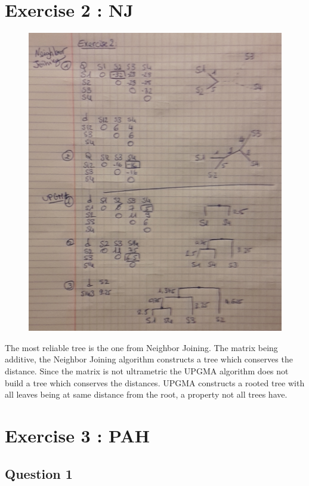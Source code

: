 \documentclass[]{article}
\begin{document}
\section{Exercise 2 : NJ}
\begin{figure}[h]
	\includegraphics*[width = \linewidth, height =0.7\textheight]{ex2.jpg}
\end{figure}
The most reliable tree is the one from Neighbor Joining. The matrix being additive, the Neighbor Joining algorithm constructs a tree which conserves the distance. Since the matrix is not ultrametric the UPGMA algorithm does not build a tree which conserves the distances. UPGMA constructs a rooted tree with all leaves being at same distance from the root, a property not all trees have.

\newpage

\section{Exercise 3 : PAH}
\subsection{Question 1}
\end{document}

